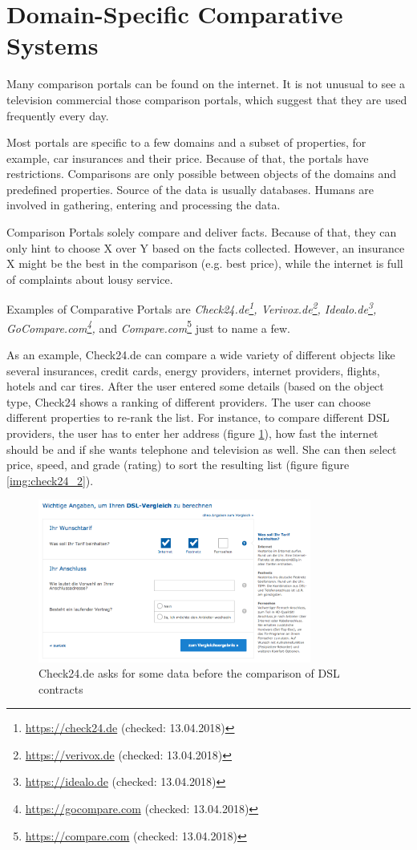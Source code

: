 \section{Domain-Specific Comparative Systems}
Many comparison portals can be found on the internet. It is not unusual to see a television commercial those comparison portals, which suggest that they are used frequently every day.

Most portals are specific to a few domains and a subset of properties, for example, car insurances and their price. Because of that, the portals have restrictions. Comparisons are only possible between objects of the domains and predefined properties. Source of the data is usually databases. Humans are involved in gathering, entering and processing the data.

Comparison Portals solely compare and deliver facts. Because of that, they can only hint to choose X over Y based on the facts collected.  However, an insurance X might be the best in the comparison (e.g. best price), while the internet is full of complaints about lousy service.

Examples of Comparative Portals are \emph{Check24.de\footnote{\url{https://check24.de} (checked: 13.04.2018)}, Verivox.de\footnote{\url{https://verivox.de} (checked: 13.04.2018)}, Idealo.de\footnote{\url{https://idealo.de} (checked: 13.04.2018)}, GoCompare.com\footnote{\url{https://gocompare.com} (checked: 13.04.2018)},} and \emph{Compare.com}\footnote{\url{https://compare.com} (checked: 13.04.2018)} just to name a few.

As an example, Check24.de can compare a wide variety of different objects like several insurances, credit cards, energy providers, internet providers, flights, hotels and car tires. After the user entered some details (based on the object type, Check24 shows a ranking of different providers. The user can choose different properties to re-rank the list.
For instance, to compare different DSL providers, the user has to enter her address (figure  \ref{img:check24_1}), how fast the internet should be and if she wants telephone and television as well. She can then select price, speed, and grade (rating) to sort the resulting list (figure figure \ref{img:check24_2}).
\begin{figure}[tbp]
 \centering
	\includegraphics[width=0.8\textwidth]{images/ds-sys/check24_1}
	\caption{Check24.de asks for some data before the comparison of DSL contracts}
		\label{img:check24_1}
\end{figure}

